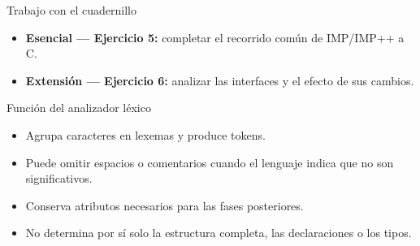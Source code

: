 \documentclass[11pt,spanish]{beamer}
\newcommand{\actividad}[1]{\textbf{\textcolor{Rojo}{#1}}}
\begin{document}
\begin{frame}{Trabajo con el cuadernillo}
\vfill

\begin{center}
\end{center}

\bigskip

\begin{itemize}
\item \textbf{Esencial --- Ejercicio 5:} completar el recorrido común de \textsc{IMP}/\textsc{IMP++} a \textsc{C}.
\item \textbf{Extensión --- Ejercicio 6:} analizar las interfaces y el efecto de sus cambios.
\end{itemize}

\vfill
\end{frame}

\begin{frame}{Función del analizador léxico}
\vfill

\begin{center}
\end{center}

\bigskip

\begin{itemize}
\item Agrupa caracteres en lexemas y produce tokens.
\item Puede omitir espacios o comentarios cuando el lenguaje indica que no son significativos.
\item Conserva atributos necesarios para las fases posteriores.
\item No determina por sí solo la estructura completa, las declaraciones o los tipos.
\end{itemize}

\vfill
\end{frame}
\end{document}
